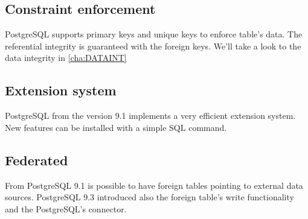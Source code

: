\subsection{Constraint enforcement}
PostgreSQL supports primary keys and unique keys to enforce table's data. The referential integrity 
is guaranteed with the foreign keys. We'll take a look to the data integrity in \ref{cha:DATAINT}

\subsection{Extension system}
PostgreSQL from the version 9.1 implements a very efficient extension system. New features can be 
installed with a simple SQL command.

\subsection{Federated}
From PostgreSQL 9.1 is possible to have foreign tables pointing to external data sources. 
PostgreSQL 9.3 introduced also the foreign table's write functionality and the PostgreSQL's 
connector.